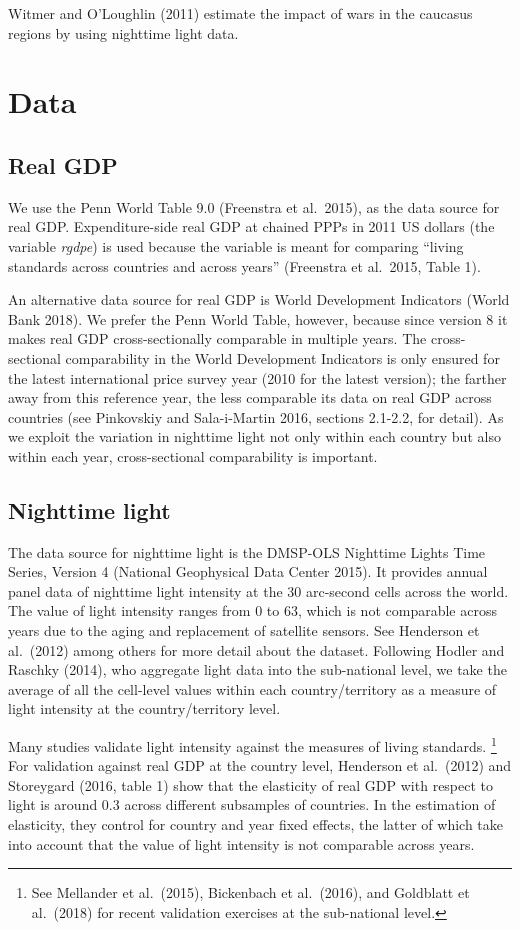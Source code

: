 \documentclass[12pt,a4paper]{article}%
\begin{document}
Witmer and O'Loughlin (2011) estimate the impact of wars in the caucasus regions by using nighttime light data.

\section{Data}
\subsection{Real GDP}
We use the Penn World Table 9.0 (Freenstra et al.\ 2015), as the data source for real GDP. 
Expenditure-side real GDP at chained PPPs in 2011 US dollars (the variable \textit{rgdpe}) is used because the variable is meant for comparing ``living standards across countries and across years'' (Freenstra et al.\ 2015, Table 1).

An alternative data source for real GDP is World Development Indicators (World Bank 2018). 
We prefer the Penn World Table, however, because since version 8 it makes real GDP cross-sectionally comparable in multiple years. 
The cross-sectional comparability in the World Development Indicators is only ensured for the latest international price survey year (2010 for the latest version); the farther away from this reference year, the less comparable its data on real GDP across countries (see Pinkovskiy and Sala-i-Martin 2016, sections 2.1-2.2, for detail).
As we exploit the variation in nighttime light not only within each country but also within each year, cross-sectional comparability is important.

\subsection{Nighttime light}
The data source for nighttime light is the DMSP-OLS Nighttime Lights Time Series, Version 4 (National Geophysical Data Center 2015). 
It provides annual panel data of nighttime light intensity at the 30 arc-second cells across the world. 
The value of light intensity ranges from 0 to 63, which is not comparable across years due to the aging and replacement of satellite sensors. 
See Henderson et al.\ (2012) among others for more detail about the dataset.
Following Hodler and Raschky (2014), who aggregate light data into the sub-national level, we take the average of all the cell-level values within each country/territory as a measure of light intensity at the country/territory level.

Many studies validate light intensity against the measures of living standards.%
\footnote{See Mellander et al.\ (2015), Bickenbach et al.\ (2016), and Goldblatt et al.\ (2018) for recent validation exercises at the sub-national level.} 
For validation against real GDP at the country level, Henderson et al.\ (2012) and Storeygard (2016, table 1) show that the elasticity of real GDP with respect to light is around 0.3 across different subsamples of countries. 
In the estimation of elasticity, they control for country and year fixed effects, the latter of which take into account that the value of light intensity is not comparable across years.
\end{document}
